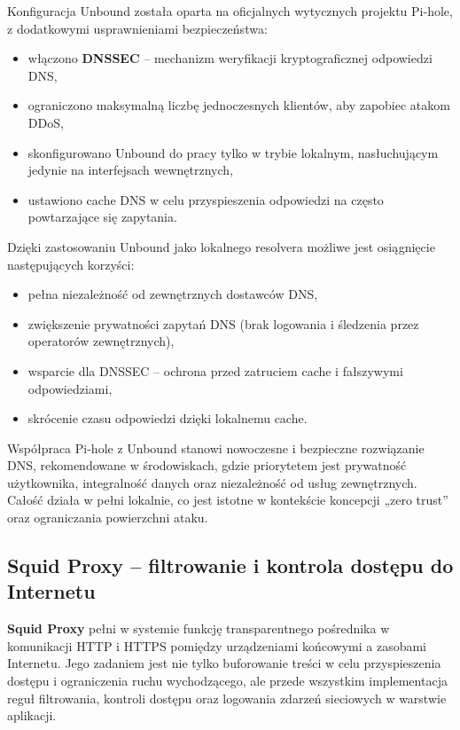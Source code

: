 \documentclass[
    left=2.5cm,         %
    right=2.5cm,        %
    top=2.5cm,          %
    bottom=3cm,         %
    bindingoffset=6mm,  %
    nohyphenation=true %
]{eiti/eiti-thesis} %
\begin{document}
Konfiguracja Unbound została oparta na oficjalnych wytycznych projektu Pi-hole, z dodatkowymi usprawnieniami bezpieczeństwa:
\begin{itemize}
    \item włączono \textbf{DNSSEC} – mechanizm weryfikacji kryptograficznej odpowiedzi DNS,
    \item ograniczono maksymalną liczbę jednoczesnych klientów, aby zapobiec atakom DDoS,
    \item skonfigurowano Unbound do pracy tylko w trybie lokalnym, nasłuchującym jedynie na interfejsach wewnętrznych,
    \item ustawiono cache DNS w celu przyspieszenia odpowiedzi na często powtarzające się zapytania.
\end{itemize}

Dzięki zastosowaniu Unbound jako lokalnego resolvera możliwe jest osiągnięcie następujących korzyści:
\begin{itemize}
    \item pełna niezależność od zewnętrznych dostawców DNS,
    \item zwiększenie prywatności zapytań DNS (brak logowania i śledzenia przez operatorów zewnętrznych),
    \item wsparcie dla DNSSEC – ochrona przed zatruciem cache i fałszywymi odpowiedziami,
    \item skrócenie czasu odpowiedzi dzięki lokalnemu cache.
\end{itemize}

Współpraca Pi-hole z Unbound stanowi nowoczesne i bezpieczne rozwiązanie DNS, rekomendowane w środowiskach, gdzie priorytetem jest prywatność użytkownika, integralność danych oraz niezależność od usług zewnętrznych. Całość działa w pełni lokalnie, co jest istotne w kontekście koncepcji „zero trust” oraz ograniczania powierzchni ataku.

\subsection{Squid Proxy – filtrowanie i kontrola dostępu do Internetu}

\textbf{Squid Proxy} pełni w systemie funkcję transparentnego pośrednika w komunikacji HTTP i HTTPS pomiędzy urządzeniami końcowymi a zasobami Internetu. Jego zadaniem jest nie tylko buforowanie treści w celu przyspieszenia dostępu i ograniczenia ruchu wychodzącego, ale przede wszystkim implementacja reguł filtrowania, kontroli dostępu oraz logowania zdarzeń sieciowych w warstwie aplikacji.
\end{document}
